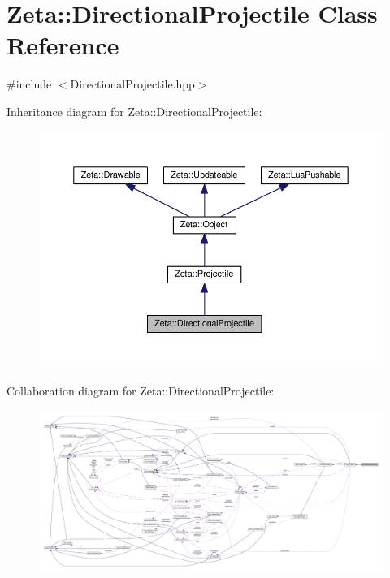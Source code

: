 \hypertarget{classZeta_1_1DirectionalProjectile}{\section{Zeta\+:\+:Directional\+Projectile Class Reference}
\label{classZeta_1_1DirectionalProjectile}
}


{\ttfamily \#include $<$Directional\+Projectile.\+hpp$>$}



Inheritance diagram for Zeta\+:\+:Directional\+Projectile\+:\nopagebreak
\begin{figure}[H]
\begin{center}
\leavevmode
\includegraphics[width=350pt]{classZeta_1_1DirectionalProjectile__inherit__graph}
\end{center}
\end{figure}


Collaboration diagram for Zeta\+:\+:Directional\+Projectile\+:
\nopagebreak
\begin{figure}[H]
\begin{center}
\leavevmode
\includegraphics[width=350pt]{classZeta_1_1DirectionalProjectile__coll__graph}
\end{center}
\end{figure}
